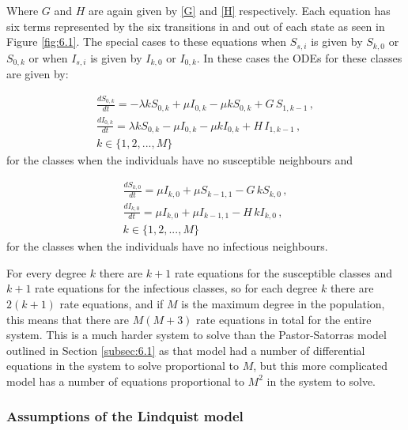 \documentclass{uonmathsreport}
\begin{document}
Where $G$ and $H$ are again given by \eqref{G} and \eqref{H} respectively. Each equation has six terms represented by the six transitions in and out of each state as seen in Figure \ref{fig:6.1}. The special cases to these equations when $S_{s,i}$ is given by $S_{k,0}$ or $S_{0,k}$ or when $I_{s,i}$ is given by $I_{k,0}$ or $I_{0,k}$. In these cases the ODEs for these classes are given by:

\begin{equation}\label{Lindquist special 1}
\begin{split}
\frac{dS_{0,k}}{dt}=-\lambda k S_{0,k}+\mu I_{0,k}-\mu k S_{0,k}+G\,S_{1,k-1}\,,\\
\frac{dI_{0,k}}{dt}=\lambda k S_{0,k}-\mu I_{0,k}-\mu k I_{0,k}+H\,I_{1,k-1}\,,\\
k \in \{1,2,...,M\}
\end{split}
\end{equation}
\noindent
for the classes when the individuals have no susceptible neighbours and

\begin{equation}\label{Lindquist special 2}
\begin{split}
\frac{dS_{k,0}}{dt}=\mu I_{k,0}+\mu S_{k-1,1}-G\,kS_{k,0}\,,\\
\frac{dI_{k,0}}{dt}=\mu I_{k,0}+\mu I_{k-1,1}-H\,kI_{k,0}\,,\\
k \in \{1,2,...,M\}
\end{split}
\end{equation}
\noindent
for the classes when the individuals have no infectious neighbours. 

For every degree $k$ there are $k+1$ rate equations for the susceptible classes and $k+1$ rate equations for the infectious classes, so for each degree $k$ there are $2(k+1)$ rate equations, and if $M$ is the maximum degree in the population, this means that there are $M(M+3)$ rate equations in total for the entire system. This is a much harder system to solve than the Pastor-Satorras model outlined in Section \ref{subsec:6.1} as that model had a number of differential equations in the system to solve proportional to $M$, but this more complicated model has a number of equations proportional to $M^2$ in the system to solve.

\subsubsection{Assumptions of the Lindquist model} \label{subsub:6.2.3}
\end{document}
